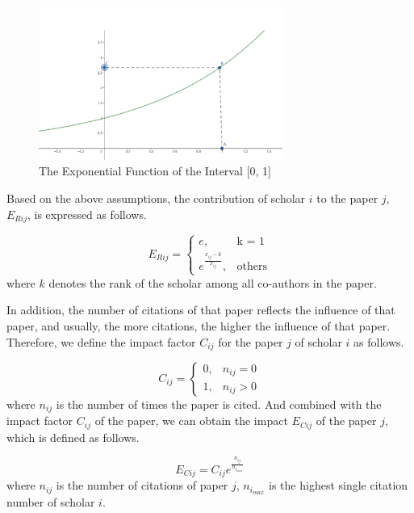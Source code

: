 \documentclass[conference]{IEEEtran}
\begin{document}
\begin{figure}[htbp] %
\centering %
\includegraphics[width=8cm]{img/exponential.png}
\caption{The Exponential Function of the Interval [0, 1]} %
\label{exponential} %
\end{figure}





Based on the above assumptions, the contribution of scholar \(i\) to the
paper \(j\), \(E_{Rij}\), is expressed as follows.

\begin{equation}\label{eq:Er}
    E_{Rij}= \begin{cases} e,& \text{k = 1} \\ e^{\frac{x_{ij}-k}{x_{ij}}}, & \text{others} \end{cases}
\end{equation}
where \(k\) denotes the rank of the scholar among all co-authors in the
paper.

In addition, the number of citations of that paper reflects the
influence of that paper, and usually, the more citations, the
higher the influence of that paper. Therefore, we define the impact
factor \(C_{ij}\) for the paper \(j\) of scholar \(i\) as follows.

\begin{equation}\label{eq:C}
    C_{ij} = \begin{cases} 0,& {{n_{ij}} = 0} \\ 1, & {{n_{ij}} > 0} \end{cases}
\end{equation}
where \(n_{ij}\) is the number of times the paper is cited. And
combined with the impact factor \(C_{ij}\) of the paper, we can
obtain the impact \(E_{Cij}\) of the paper \(j\), which is defined
as follows.

\begin{equation}\label{eq:Ec}
    E_{Cij} = C_{ij} e^{\frac{n_{ij}}{n_{i_{max}}}}
\end{equation}
where \(n_{ij}\) is the number of citations of paper
\(j\), \(n_{i_{max}}\) is the highest single citation number of scholar \(i\).
\end{document}

